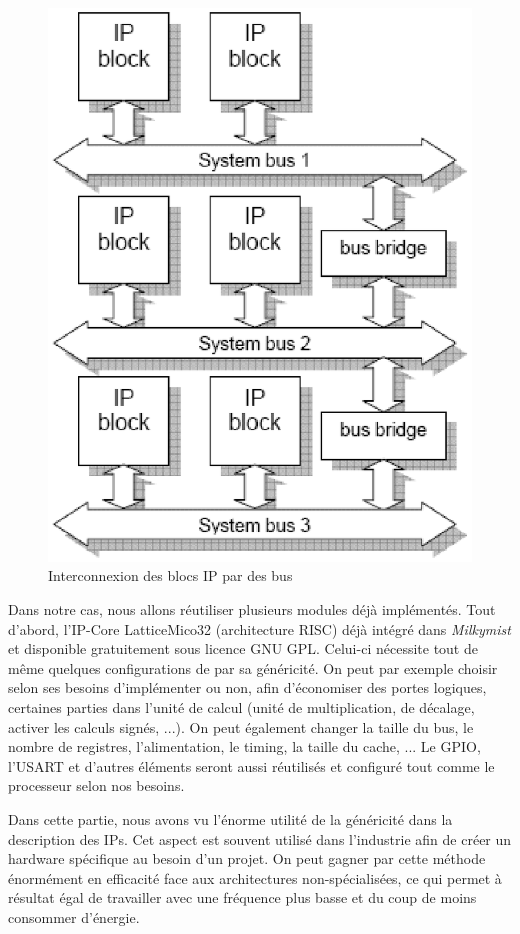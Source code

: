 \begin{figure}
\begin{center}
\includegraphics[scale=0.4]{soc_interconnect.eps}
\end{center}
\caption{Interconnexion des blocs IP par des bus}
\end{figure}

Dans notre cas, nous allons réutiliser plusieurs modules déjà implémentés. Tout d'abord, l'IP-Core LatticeMico32 (architecture RISC) déjà intégré dans \textit{Milkymist} et disponible gratuitement sous licence GNU GPL. Celui-ci nécessite tout de même quelques configurations de par sa généricité. On peut par exemple choisir selon ses besoins d'implémenter ou non, afin d'économiser des portes logiques, certaines parties dans l'unité de calcul (unité de multiplication, de décalage, activer les calculs signés, ...). On peut également changer la taille du bus, le nombre de registres, l'alimentation, le timing, la taille du cache, ...
Le GPIO, l'USART et d'autres éléments seront aussi réutilisés et configuré tout comme le processeur selon nos besoins.


Dans cette partie, nous avons vu l'énorme utilité de la généricité dans la description des IPs. Cet aspect est souvent utilisé dans l'industrie afin de créer un hardware spécifique au besoin d'un projet. On peut gagner par cette méthode énormément en efficacité face aux architectures non-spécialisées, ce qui permet à résultat égal de travailler avec une fréquence plus basse et du coup de moins consommer d'énergie.

